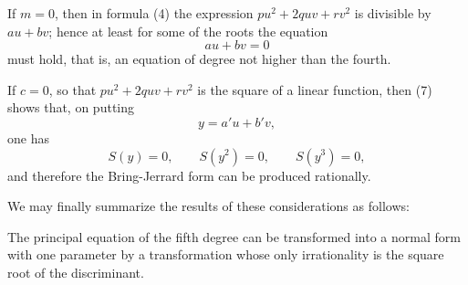 \documentclass[11pt]{article}
\begin{document}
If $m=0$, then in formula (4) the expression $pu^2+2quv+rv^2$ is divisible by $au+bv$; hence at least for some of the roots the equation
\[
 au+bv=0
\]
must hold, that is, an equation of degree not higher than the fourth.

If $c=0$, so that $pu^2+2quv+rv^2$ is the square of a linear function, then (7) shows that, on putting
\[
 y=a'u+b'v,
\]
one has
\[
 S(y)=0,
 \qquad S(y^2)=0,
 \qquad S(y^3)=0,
\]
and therefore the Bring-Jerrard form can be produced rationally.

We may finally summarize the results of these considerations as follows:

The principal equation of the fifth degree can be transformed into a normal form with one parameter by a transformation whose only irrationality is the square root of the discriminant.
\end{document}
